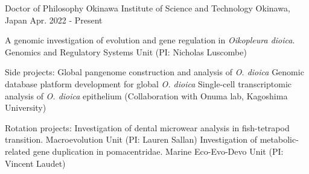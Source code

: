 

\begin{cventries}

  \cventry
    {Doctor of Philosophy} %
    {Okinawa Institute of Science and Technology} %
    {Okinawa, Japan} %
    {Apr. 2022 - Present} %
    {
      \begin{cvitems} %
        \item {A genomic investigation of evolution and gene regulation in \textit{Oikopleura dioica}. Genomics and Regulatory Systems Unit (PI: Nicholas Luscombe)}
        \item {Side projects:\newline
        Global pangenome construction and analysis of \textit{O. dioica}\newline
        Genomic database platform development for global \textit{O. dioica}\newline
        Single-cell transcriptomic analysis of \textit{O. dioica} epithelium (Collaboration with Onuma lab, Kagoshima University)
        }
        \item {Rotation projects:\newline
        Investigation of dental microwear analysis in fish-tetrapod transition. Macroevolution Unit (PI: Lauren Sallan) \newline
        Investigation of metabolic-related gene duplication in pomacentridae. Marine Eco-Evo-Devo Unit (PI: Vincent Laudet)
        }
      \end{cvitems}
    }

\end{cventries}
\vspace{-0.5em}

